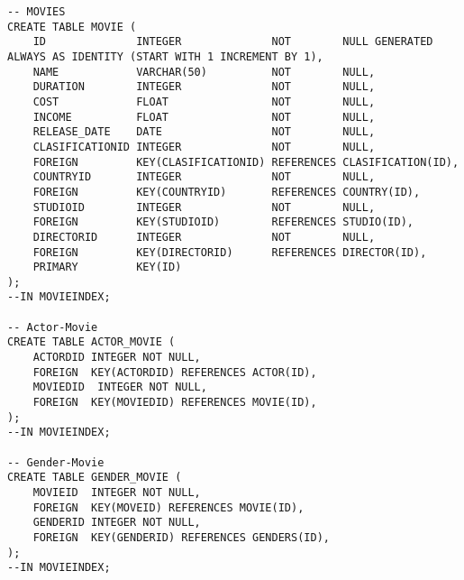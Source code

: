 \documentclass[2pt]{article}
\begin{document}
\begin{verbatim}
-- MOVIES
CREATE TABLE MOVIE (
    ID              INTEGER              NOT        NULL GENERATED ALWAYS AS IDENTITY (START WITH 1 INCREMENT BY 1),
    NAME            VARCHAR(50)          NOT        NULL,
    DURATION        INTEGER              NOT        NULL,
    COST            FLOAT                NOT        NULL,
    INCOME          FLOAT                NOT        NULL,
    RELEASE_DATE    DATE                 NOT        NULL,
    CLASIFICATIONID INTEGER              NOT        NULL,
    FOREIGN         KEY(CLASIFICATIONID) REFERENCES CLASIFICATION(ID),
    COUNTRYID       INTEGER              NOT        NULL,
    FOREIGN         KEY(COUNTRYID)       REFERENCES COUNTRY(ID),
    STUDIOID        INTEGER              NOT        NULL,
    FOREIGN         KEY(STUDIOID)        REFERENCES STUDIO(ID),
    DIRECTORID      INTEGER              NOT        NULL,
    FOREIGN         KEY(DIRECTORID)      REFERENCES DIRECTOR(ID),
    PRIMARY         KEY(ID)
);
--IN MOVIEINDEX;

-- Actor-Movie
CREATE TABLE ACTOR_MOVIE (
    ACTORDID INTEGER NOT NULL,
    FOREIGN  KEY(ACTORDID) REFERENCES ACTOR(ID),
    MOVIEDID  INTEGER NOT NULL,
    FOREIGN  KEY(MOVIEDID) REFERENCES MOVIE(ID),
);
--IN MOVIEINDEX;

-- Gender-Movie
CREATE TABLE GENDER_MOVIE (
    MOVIEID  INTEGER NOT NULL,
    FOREIGN  KEY(MOVEID) REFERENCES MOVIE(ID),
    GENDERID INTEGER NOT NULL,
    FOREIGN  KEY(GENDERID) REFERENCES GENDERS(ID),
);
--IN MOVIEINDEX;

\end{verbatim}
\end{document}
